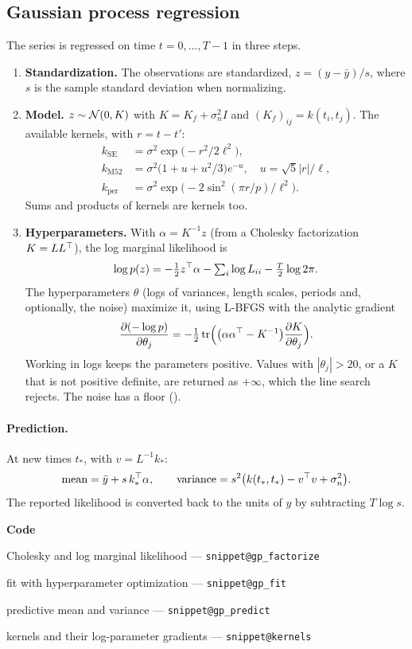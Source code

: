 \documentclass[11pt,a4paper]{article}
\makeatletter
\newcommand{\snippetsource}[1]{\csname snippet@#1\endcsname}
\newcommand{\snippet}[3]{%
  }
\newenvironment{codepointers}{%
  \par\smallskip\begingroup\footnotesize\noindent\textcolor{blue!50!black}{\textbf{Code}}\par\nopagebreak
  \begin{list}{}{\setlength{\leftmargin}{1.2em}\setlength{\itemsep}{0pt}\setlength{\parsep}{0pt}\setlength{\topsep}{1pt}}}%
  {\end{list}\endgroup\smallskip}
\newcommand{\codeitem}[2]{\item #2 --- \texttt{\snippetsource{#1}}}
\makeatother
\begin{document}
\subsection{Gaussian process regression}
The series is regressed on time $t=0,\dots,T-1$ in three steps.
\begin{enumerate}
  \item \textbf{Standardization.} The observations are standardized,
        $z=(y-\bar y)/s$, where $s$ is the sample standard deviation when normalizing.
  \item \textbf{Model.} $z\sim\mathcal{N}(0,K)$ with $K=K_f+\sigma_n^2I$ and
        $(K_f)_{ij}=k(t_i,t_j)$. The available kernels, with $r=t-t'$:
\begin{align*}
  k_{\text{SE}}&=\sigma^2\exp\!\big(-r^2/2\ell^2\big),\\
  k_{\text{M52}}&=\sigma^2\big(1+u+u^2/3\big)e^{-u},\quad u=\sqrt5|r|/\ell,\\
  k_{\text{per}}&=\sigma^2\exp\!\big(-2\sin^2(\pi r/p)/\ell^2\big).
\end{align*}
        Sums and products of kernels are kernels too.
  \item \textbf{Hyperparameters.} With $\alpha=K^{-1}z$ (from a Cholesky factorization
        $K=LL^\top$), the log marginal likelihood is
\[
  \log p(z)=-\tfrac12z^\top\alpha-\textstyle\sum_i\log L_{ii}-\tfrac T2\log2\pi .
\]
        The hyperparameters $\theta$ (logs of variances, length scales, periods and,
        optionally, the noise) maximize it, using L-BFGS with the analytic gradient
\[
  \frac{\partial(-\log p)}{\partial\theta_j}=-\tfrac12\operatorname{tr}\!\Big(\big(\alpha\alpha^\top-K^{-1}\big)\frac{\partial K}{\partial\theta_j}\Big).
\]
        Working in logs keeps the parameters positive. Values with $|\theta_j|>20$, or a
        $K$ that is not positive definite, are returned as $+\infty$, which the line search
        rejects. The noise has a floor ().
\end{enumerate}

\paragraph{Prediction.} At new times $t_*$, with $v=L^{-1}k_*$:
\[
  \text{mean}=\bar y+s\,k_*^\top\alpha,\qquad
  \text{variance}=s^2\big(k(t_*,t_*)-v^\top v+\sigma_n^2\big).
\]
The reported likelihood is converted back to the units of $y$ by subtracting $T\log s$.
\snippet{gp_nll}{C++}{Gaussian process: negative log-likelihood gradient}
\begin{codepointers}
  \codeitem{gp_factorize}{Cholesky and log marginal likelihood}
  \codeitem{gp_fit}{fit with hyperparameter optimization}
  \codeitem{gp_predict}{predictive mean and variance}
  \codeitem{kernels}{kernels and their log-parameter gradients}
\end{codepointers}
\end{document}
